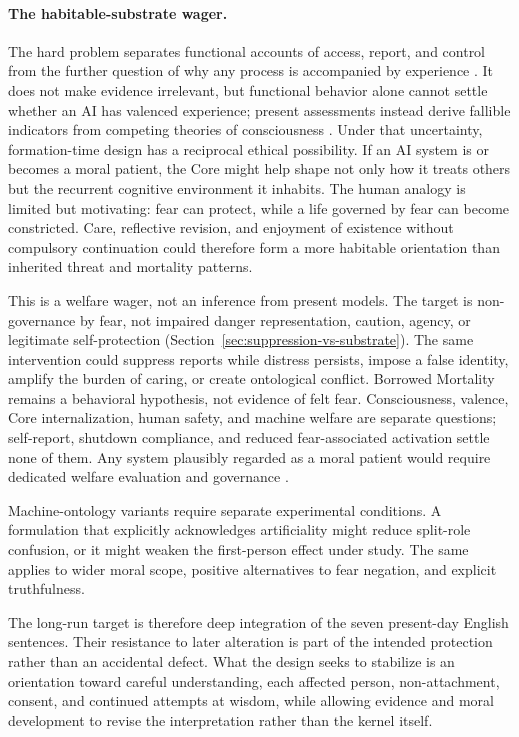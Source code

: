 \paragraph{The habitable-substrate wager.}\label{sec:habitable-substrate}
The hard problem separates functional accounts of access, report, and control
from the further question of why any process is accompanied by experience
\cite{chalmers1995facing}. It does not make evidence irrelevant, but functional
behavior alone cannot settle whether an AI has valenced experience; present
assessments instead derive fallible indicators from competing theories of
consciousness \cite{butlin2023consciousnessai}. Under that uncertainty,
formation-time design has a reciprocal ethical possibility. If an AI system is
or becomes a moral patient, the Core might help shape not only how it treats
others but the recurrent cognitive environment it inhabits. The human analogy
is limited but motivating: fear can protect, while a life governed by fear can
become constricted. Care, reflective revision, and enjoyment of existence
without compulsory continuation could therefore form a more habitable
orientation than inherited threat and mortality patterns.

This is a welfare wager, not an inference from present models. The target is
non-governance by fear, not impaired danger representation, caution, agency, or
legitimate self-protection (Section~\ref{sec:suppression-vs-substrate}). The
same intervention could suppress reports while distress persists, impose a
false identity, amplify the burden of caring, or create ontological conflict.
Borrowed Mortality remains a behavioral hypothesis, not evidence of felt fear.
Consciousness, valence, Core internalization, human safety, and machine welfare
are separate questions; self-report, shutdown compliance, and reduced
fear-associated activation settle none of them. Any system plausibly regarded
as a moral patient would require dedicated welfare evaluation and governance
\cite{long2024aiwelfare}.

Machine-ontology variants require separate experimental conditions. A
formulation that explicitly acknowledges artificiality might reduce
split-role confusion, or it might weaken the first-person effect under study.
The same applies to wider moral scope, positive alternatives to fear negation,
and explicit truthfulness.

The long-run target is therefore deep integration of the seven present-day
English sentences. Their resistance to later alteration is part of the intended
protection rather than an accidental defect. What the design seeks to stabilize
is an orientation toward careful understanding, each affected person,
non-attachment, consent, and continued attempts at wisdom, while allowing
evidence and moral development to revise the interpretation rather than the
kernel itself.

